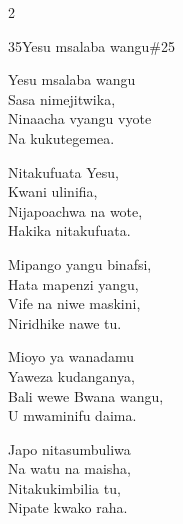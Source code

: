 \begin{multicols}{2}
\begin{hymn}{35}{Yesu msalaba wangu}{\#25}
\begin{stanza}
Yesu msalaba wangu\\
Sasa nimejitwika,\\
Ninaacha vyangu vyote\\
Na kukutegemea.
\end{stanza}
\begin{chorus}
Nitakufuata Yesu,\\
Kwani ulinifia,\\
Nijapoachwa na wote,\\
Hakika nitakufuata.
\end{chorus}
\begin{stanza}
Mipango yangu binafsi,\\
Hata mapenzi yangu,\\
Vife na niwe maskini,\\
Niridhike nawe tu.
\end{stanza}
\begin{stanza}
Mioyo ya wanadamu\\
Yaweza kudanganya,\\
Bali wewe Bwana wangu,\\
U mwaminifu daima.
\end{stanza}
\begin{stanza}
Japo nitasumbuliwa\\
Na watu na maisha,\\
Nitakukimbilia tu,\\
Nipate kwako raha.
\end{stanza}
\end{hymn}


\end{multicols}

